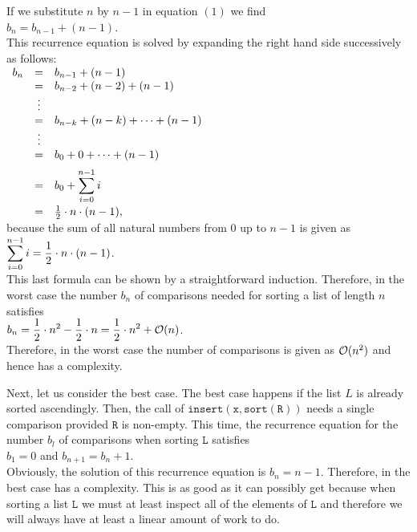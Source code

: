 If we substitute $n$ by $n-1$ in equation $(1)$ we find
\\[0.2cm]
\hspace*{1.3cm}
$b_n = b_{n-1} + (n - 1)$.
\\[0.2cm]
This recurrence equation is solved by expanding the right hand side successively as follows:
\\[0.2cm]
\hspace*{1.3cm}
$
\begin{array}[t]{lcl}
  b_{n} & = & b_{n-1} + (n - 1)                     \\ 
        & = & b_{n-2} + (n - 2) + (n - 1)           \\ 
        & \vdots &                                  \\
        & = & b_{n-k} + (n - k) + \cdots + (n - 1)  \\ 
        & \vdots &                                  \\
        & = & b_{0} + 0 + \cdots + (n - 1)      \\[0.2cm] 
        & = & \displaystyle b_{0} + \sum\limits_{i = 0}^{n - 1} i \\[0.4cm]
        & = & \frac{1}{2} \cdot n \cdot (n - 1),
\end{array}
$
\\[0.2cm]
because the sum of all natural numbers from 0 up to  $n - 1$ is given as
\\[0.2cm]
\hspace*{1.3cm}
$\displaystyle\sum\limits_{i = 0}^{n - 1} i  = \frac{1}{2} \cdot n \cdot (n - 1)$.
\\[0.2cm]
This last formula can be shown by a straightforward induction.  Therefore, in the worst case the number $b_n$ of
comparisons needed for sorting a list of length $n$  satisfies 
\\[0.2cm]
\hspace*{1.3cm}
$\displaystyle b_n = \frac{1}{2} \cdot n^2 - \frac{1}{2} \cdot n = \frac{1}{2} \cdot n^2 + \mathcal{O}(n)$.
\\[0.2cm]
Therefore, in the worst case the number of comparisons is given as $\mathcal{O}(n^2)$ and hence
 has a  complexity.


Next, let us consider the best case.  The best case happens if the list $L$ is already sorted
ascendingly.  Then, the call of 
$\mathtt{insert}(\texttt{x},\mathtt{sort}(\texttt{R}))$ needs a single comparison provided $\texttt{R}$ is non-empty.  This time, the recurrence
equation for the number $b_l$ of comparisons when sorting $\texttt{L}$ satisfies
 \\[0.2cm]
\hspace*{1.3cm}
$b_1 = 0$ \quad and \quad $b_{n+1} = b_n + 1$. 
\\[0.2cm]
Obviously, the solution of this recurrence equation is $b_n = n-1$.  Therefore, in the best case
 has a  complexity.  This is as good as it can possibly get because when
sorting a list $\texttt{L}$ we must at least inspect all of the elements of $\texttt{L}$ and therefore we will
always have at least a linear amount of work to do.


